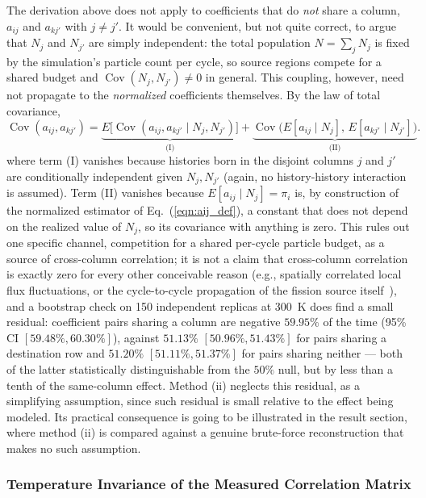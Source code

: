 \documentclass{style/nseJournal}
\begin{document}
The derivation above does not apply to coefficients that do \emph{not} share a column, $a_{ij}$ and $a_{kj'}$ with $j\neq j'$. It would be convenient, but not quite correct, to argue that $N_j$ and $N_{j'}$ are simply independent: the total population $N=\sum_j N_j$ is fixed by the simulation's particle count per cycle, so source regions compete for a shared budget and $\operatorname{Cov}(N_j,N_{j'})\neq0$ in general. This coupling, however, need not propagate to the \emph{normalized} coefficients themselves. By the law of total covariance,
\begin{equation}
  \operatorname{Cov}(a_{ij},a_{kj'}) = \underbrace{E\big[\operatorname{Cov}(a_{ij},a_{kj'}\mid N_j,N_{j'})\big]}_{\text{(I)}}
  + \underbrace{\operatorname{Cov}\big(E[a_{ij}\mid N_j],\, E[a_{kj'}\mid N_{j'}]\big)}_{\text{(II)}} .
  \label{eqn:total_cov_law}
\end{equation}
where term (I) vanishes because histories born in the disjoint columns $j$ and $j'$ are conditionally independent given $N_j,N_{j'}$ (again, no history-history interaction is assumed). Term (II) vanishes because $E[a_{ij}\mid N_j]=\pi_i$ is, by construction of the normalized estimator of Eq.~(\ref{eqn:aij_def}), a constant that does not depend on the realized value of $N_j$, so its covariance with anything is zero. This rules out one specific channel, competition for a shared per-cycle particle budget, as a source of cross-column correlation; it is not a claim that cross-column correlation is exactly zero for every other conceivable reason (e.g., spatially correlated local flux fluctuations, or the cycle-to-cycle propagation of the fission source itself~\cite{UekiNSE2003}), and a bootstrap check on 150 independent replicas at 300~K does find a small residual: coefficient pairs sharing a column are negative $59.95\%$ of the time (95\% CI $[59.48\%,60.30\%]$), against $51.13\%$ $[50.96\%,51.43\%]$ for pairs sharing a destination row and $51.20\%$ $[51.11\%,51.37\%]$ for pairs sharing neither --- both of the latter statistically distinguishable from the $50\%$ null, but by less than a tenth of the same-column effect. Method (ii) neglects this residual, as a simplifying assumption, since  such residual is small relative to the effect being modeled. Its practical consequence is going to be illustrated in the result section,  where method (ii) is compared against a genuine brute-force reconstruction that makes no such assumption.

\subsubsection{Temperature Invariance of the Measured Correlation Matrix}
\label{sec:t_invariance}
\end{document}

